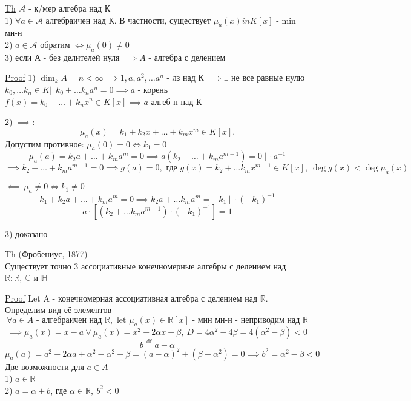 \documentclass[a4paper]{article}
\begin{document}
\begin{tcolorbox}
    \underline{Th} $ \mathcal{A} $ - к/мер алгебра над К\\
    1) $ \forall a \in \mathcal{A} $ алгебраичен над К. В частности, существует
    $ \mu_a(x) in K[x] $ - min мн-н\\
    2) $ a \in \mathcal{A} \text{ обратим } \iff \mu_a(0) \neq 0 $ \\
    3) если А - без делителей нуля $ \implies A $ - алгебра с делением

    \underline{Proof} 1) $ \dim_k A = n < \infty \implies 1, a, a^2, \dots a^{n} $ 
    - лз над К $ \implies \exists $ не все равные нулю $ k_0, \dots k_n \in K | \
    \ k_0 + \dots k_n a^{n} = 0 \implies a $ - корень $ f(x) = k_0 + \dots + k_n x^{n}
    \in K[x] \implies a $ алгеб-н над К

    2) $ \implies: $ 
    \[
        \mu_a(x) = k_1 + k_2 x + \dots + k_m x^{m} \in K[x].
    \]
    Допустим противное: $ \mu_a(0) = 0 \iff k_1 = 0 $ 
    \[
        \mu_a(a) = k_2 a + \dots + k_m a^{m} = 0 \implies a(k_2 + \dots + 
        k_m a^{m-1}) = 0 \ | \ \cdot a^{-1}
    \]
    \[
        \implies k_2 + \dots + k_m a^{m-1} = 0 \implies g(a) = 0, \text{ где }
        g(x) = k_2 + \dots k_m x^{m-1} \in K[x], \ \deg g(x) < \deg \mu_a (x)
    \]

    $ \impliedby \ \mu_a \neq 0 \iff k_1 \neq 0$ 
    \[
        k_1 + k_2a + \dots + k_m a^{m} = 0 \implies
        k_2 a + \dots k_m a^{m} = - k_1 \ | \ \cdot(-k_1)^{-1}
    \]
    \[
        a \cdot [(k_2 + \dots k_m a^{m-1}) \cdot (-k_1)^{-1}] = 1
    \]

    3) доказано 
\end{tcolorbox}

\begin{tcolorbox}
\underline{Th} (Фробениус, 1877)\\
Существует точно 3 ассоциативные конечномерные алгебры с делением над $ \mathbb{R}:
\mathbb{R}, \ \mathbb{C} $ и $ \mathbb{H} $ 

\underline{Proof} Let A - конечномерная ассоциативная алгебра с делением над 
$ \mathbb{R} $. Определим вид её элементов
\[
    \forall a \in A \text{ - алгебраичен над } \mathbb{R}, \text{ let }
    \mu_a(x) \in \mathbb{R}[x] \text{ - мин мн-н - неприводим над } \mathbb{R}
\]
\[
    \implies \mu_a(x) = x - a \lor \mu_a(x) = x^2 - 2 \alpha x + \beta, \ 
    D = 4 \alpha^2 - 4 \beta = 4(\alpha^2 - \beta) < 0
\]
\[
    b \stackrel{\text{df}}{=} a - \alpha
\]
\[
    \mu_a(a) = a^2 - 2 \alpha a + \alpha^2 - \alpha^2 + \beta = (a - \alpha)^2
    + (\beta - \alpha^2) = 0 \implies b^2 = \alpha^2 - \beta < 0
\]
Две возможности для $ a \in A $\\
1) $ a \in \mathbb{R} $ \\
2) $ a = \alpha + b $, где $ \alpha \in \mathbb{R}, \ b^2 < 0 $ 
\end{tcolorbox}
\end{document}
